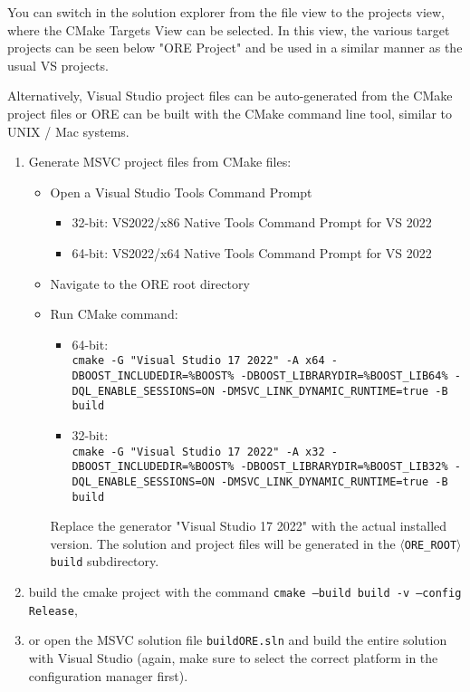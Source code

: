 You can switch in the solution explorer from the file view to the projects view, where the CMake Targets View can be selected. In this view, the various target projects can be seen below "ORE Project" and be used in a similar manner as the usual VS projects.

\medskip

Alternatively, Visual Studio project files can be auto-generated from the CMake project files or ORE can be built with the CMake command line tool, similar to UNIX / Mac systems.

\begin{enumerate}

\item Generate MSVC project files from CMake files:
\begin{itemize}
\item Open a Visual Studio Tools Command Prompt
\begin{itemize}
\item 32-bit: VS2022/x86 Native Tools Command Prompt for VS 2022
\item 64-bit: VS2022/x64 Native Tools Command Prompt for VS 2022
\end{itemize}
\item Navigate to the ORE root directory
\item Run CMake command:
\begin{itemize}
\item 64-bit: \\
{\tt cmake -G "Visual Studio 17 2022" -A x64 -DBOOST\_INCLUDEDIR=\%BOOST\% -DBOOST\_LIBRARYDIR=\%BOOST\_LIB64\% -DQL\_ENABLE\_SESSIONS=ON -DMSVC\_LINK\_DYNAMIC\_RUNTIME=true -B build}
\item 32-bit: \\
{\tt cmake -G "Visual Studio 17 2022" -A x32 -DBOOST\_INCLUDEDIR=\%BOOST\% -DBOOST\_LIBRARYDIR=\%BOOST\_LIB32\% -DQL\_ENABLE\_SESSIONS=ON -DMSVC\_LINK\_DYNAMIC\_RUNTIME=true -B build}
\end{itemize}
Replace the generator "Visual Studio 17 2022" with the actual installed version.
The solution and project files will be generated in the {\tt $\langle$ORE\_ROOT$\rangle${\bs}build} subdirectory.
\end{itemize}

\item build the cmake project with the command {\tt cmake --build build -v --config Release},

\item or open the MSVC solution file {\tt build{\bs}ORE.sln} and build the entire solution with Visual Studio (again, make sure to select the correct platform in the configuration manager first).
\end{enumerate}

